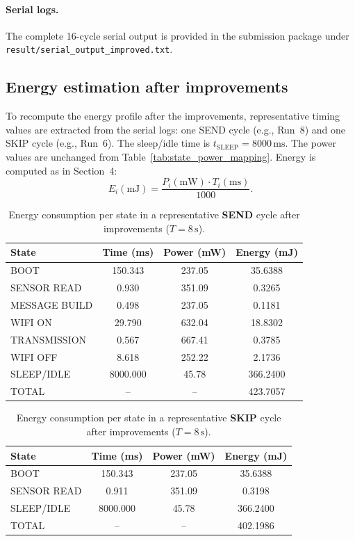 \documentclass{article}
\begin{document}
\paragraph{Serial logs.}
The complete 16-cycle serial output is provided in the submission package under
\texttt{result/serial\_output\_improved.txt}.

\subsection{Energy estimation after improvements}
\label{subsec:energy_after}

To recompute the energy profile after the improvements, representative timing values are extracted from the serial logs:
one SEND cycle (e.g., Run~8) and one SKIP cycle (e.g., Run~6). The sleep/idle time is \(t_{\mathrm{SLEEP}}=8000\,\mathrm{ms}\).
The power values are unchanged from Table~\ref{tab:state_power_mapping}. Energy is computed as in Section~4:
\[
E_i(\mathrm{mJ})=\frac{P_i(\mathrm{mW})\cdot T_i(\mathrm{ms})}{1000}.
\]

\begin{table}[H]
\centering
\begin{tabular}{l c c c}
\hline
State & Time (ms) & Power (mW) & Energy (mJ) \\
\hline
BOOT          & 150.343  & 237.05 & 35.6388 \\
SENSOR READ   & 0.930    & 351.09 & 0.3265 \\
MESSAGE BUILD & 0.498    & 237.05 & 0.1181 \\
WIFI ON       & 29.790   & 632.04 & 18.8302 \\
TRANSMISSION  & 0.567    & 667.41 & 0.3785 \\
WIFI OFF      & 8.618    & 252.22 & 2.1736 \\
SLEEP/IDLE    & 8000.000 & 45.78  & 366.2400 \\
\hline
TOTAL         & --       & --     & 423.7057 \\
\hline
\end{tabular}
\caption{Energy consumption per state in a representative \textbf{SEND} cycle after improvements (\(T=8\,\mathrm{s}\)).}
\label{tab:energy_send_after}
\end{table}

\begin{table}[H]
\centering
\begin{tabular}{l c c c}
\hline
State & Time (ms) & Power (mW) & Energy (mJ) \\
\hline
BOOT        & 150.343  & 237.05 & 35.6388 \\
SENSOR READ & 0.911    & 351.09 & 0.3198 \\
SLEEP/IDLE  & 8000.000 & 45.78  & 366.2400 \\
\hline
TOTAL       & --       & --     & 402.1986 \\
\hline
\end{tabular}
\caption{Energy consumption per state in a representative \textbf{SKIP} cycle after improvements (\(T=8\,\mathrm{s}\)).}
\label{tab:energy_skip_after}
\end{table}
\end{document}

